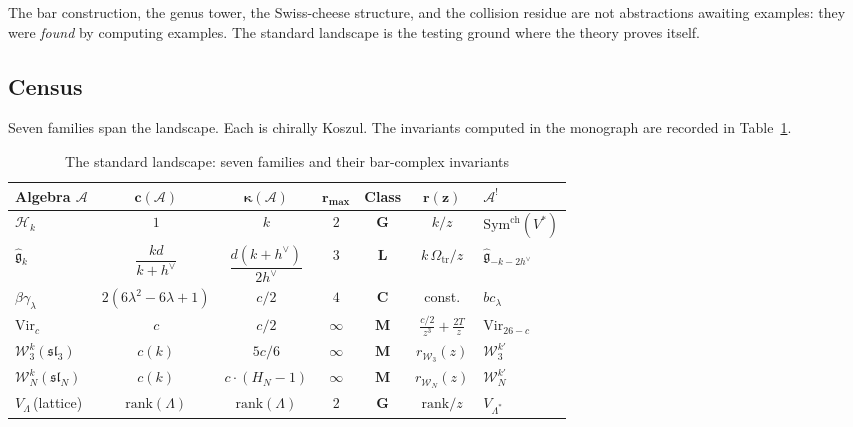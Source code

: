 \documentclass[11pt,reqno]{amsart}
\theoremstyle{definition}
\theoremstyle{remark}
\newcommand{\cA}{\mathcal{A}}
\newcommand{\cH}{\mathcal{H}}
\newcommand{\cW}{\mathcal{W}}
\newcommand{\fg}{\mathfrak{g}}
\newcommand{\Sym}{\mathrm{Sym}}
\newcommand{\Vir}{\mathrm{Vir}}
\numberwithin{equation}{section}
\begin{document}
The bar construction, the genus tower, the Swiss-cheese
structure, and the collision residue are not abstractions
awaiting examples: they were \emph{found} by computing
examples. The standard landscape is the testing ground
where the theory proves itself.

\subsection{Census}
\label{ssec:census}

Seven families span the landscape. Each is chirally
Koszul. The invariants computed in the monograph are
recorded in Table~\ref{tab:census}.

\begin{table}[ht]
\centering
\caption{The standard landscape: seven families and their
 bar-complex invariants}
\label{tab:census}
\renewcommand{\arraystretch}{1.7}
{\small
\begin{tabular}{lcccccl}
\toprule
\textbf{Algebra $\cA$}
 & $\boldsymbol{c(\cA)}$
 & $\boldsymbol{\kappa(\cA)}$
 & $\boldsymbol{r_{\max}}$
 & \textbf{Class}
 & $\boldsymbol{r(z)}$
 & $\boldsymbol{\cA^!}$ \\
\midrule
$\cH_k$
 & $1$
 & $k$
 & $2$ & $\mathbf{G}$
 & $k/z$
 & $\Sym^{\mathrm{ch}}(V^*)$ \\[2pt]
$\widehat{\fg}_k$
 & $\dfrac{kd}{k+h^\vee}$
 & $\dfrac{d(k+h^\vee)}{2h^\vee}$
 & $3$ & $\mathbf{L}$
 & $k\,\Omega_{\mathrm{tr}}/z$
 & $\widehat{\fg}_{-k-2h^\vee}$ \\[6pt]
$\beta\gamma_\lambda$
 & $2(6\lambda^2{-}6\lambda{+}1)$
 & $c/2$
 & $4$ & $\mathbf{C}$
 & const.
 & $bc_\lambda$ \\[2pt]
$\Vir_c$
 & $c$
 & $c/2$
 & $\infty$ & $\mathbf{M}$
 & $\frac{c/2}{z^3} + \frac{2T}{z}$
 & $\Vir_{26-c}$ \\[4pt]
$\cW^k_3(\mathfrak{sl}_3)$
 & $c(k)$
 & $5c/6$
 & $\infty$ & $\mathbf{M}$
 & $r_{\cW_3}(z)$
 & $\cW^{k'}_3$ \\[2pt]
$\cW^k_N(\mathfrak{sl}_N)$
 & $c(k)$
 & $c \cdot (H_N{-}1)$
 & $\infty$ & $\mathbf{M}$
 & $r_{\cW_N}(z)$
 & $\cW^{k'}_N$ \\[2pt]
$V_\Lambda$\,(lattice)
 & $\mathrm{rank}(\Lambda)$
 & $\mathrm{rank}(\Lambda)$
 & $2$ & $\mathbf{G}$
 & $\mathrm{rank}/z$
 & $V_{\Lambda^*}$ \\
\bottomrule
\end{tabular}
}
\end{table}
\end{document}
